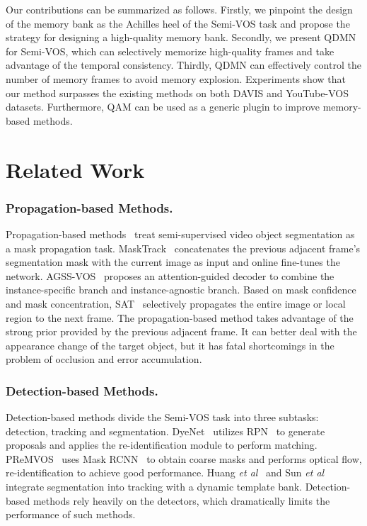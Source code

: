 \documentclass[runningheads]{llncs}
\begin{document}
Our contributions can be summarized as follows.
Firstly, we pinpoint the design of the memory bank as the Achilles heel of the Semi-VOS task and propose the strategy for designing a high-quality memory bank.
Secondly, we present QDMN for Semi-VOS, which can selectively memorize high-quality frames and take advantage of the temporal consistency.
Thirdly, QDMN can effectively control the number of memory frames to avoid memory explosion.
Experiments show that our method surpasses the existing methods on both DAVIS and YouTube-VOS datasets. Furthermore, QAM can be used as a generic plugin to improve memory-based methods.  

                                                     
 \section{Related Work}

    \subsubsection{Propagation-based Methods.} Propagation-based methods~\cite{objectflow,segflow,favos,dvsnet,osvos,maskrnn,onavos} treat semi-supervised video object segmentation as a mask propagation task.
    MaskTrack~\cite{masktrack} concatenates the previous adjacent frame's segmentation mask with the current image as input and online fine-tunes the network. 
AGSS-VOS~\cite{agss-vos} proposes an attention-guided decoder to combine the instance-specific branch and instance-agnostic branch.
    Based on mask confidence and mask concentration, SAT~\cite{sat} selectively propagates the entire image or local region to the next frame.
The propagation-based method takes advantage of the strong prior provided by the previous adjacent frame. It can better deal with the appearance change of the target object, but it has fatal shortcomings in the problem of occlusion and error accumulation.
    
    \subsubsection{Detection-based Methods.} Detection-based methods divide the Semi-VOS task into three subtasks: detection, tracking and segmentation.
DyeNet~\cite{dyenet} utilizes RPN~\cite{fasterrcnn} to generate proposals and applies the re-identification module to perform matching. 
    PReMVOS~\cite{premvos} uses Mask RCNN~\cite{maskrcnn} to obtain coarse masks and performs optical flow, re-identification to achieve good performance. 
    Huang \textit{et al}~\cite{topdown1} and Sun \textit{et al}~\cite{topdown2} integrate segmentation into tracking with a dynamic template bank. 
Detection-based methods rely heavily on the detectors, which dramatically limits the performance of such methods.
    
\end{document}

